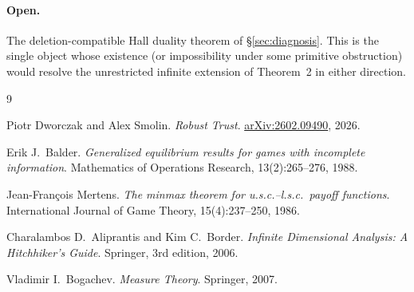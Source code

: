 \documentclass[11pt]{article}
\theoremstyle{definition}
\theoremstyle{remark}
\begin{document}
\paragraph{Open.}
The deletion-compatible Hall duality theorem of \S\ref{sec:diagnosis}.
This is the single object whose existence (or impossibility under
some primitive obstruction) would resolve the unrestricted infinite
extension of Theorem~2 in either direction.

\begin{thebibliography}{9}

Piotr Dworczak and Alex Smolin.
\emph{Robust Trust}.
\href{https://arxiv.org/abs/2602.09490}{arXiv:2602.09490}, 2026.

Erik J.\ Balder.
\emph{Generalized equilibrium results for games with incomplete information}.
Mathematics of Operations Research, 13(2):265--276, 1988.

Jean-François Mertens.
\emph{The minmax theorem for u.s.c.--l.s.c.\ payoff functions}.
International Journal of Game Theory, 15(4):237--250, 1986.

Charalambos D.\ Aliprantis and Kim C.\ Border.
\emph{Infinite Dimensional Analysis: A Hitchhiker's Guide}.
Springer, 3rd edition, 2006.

Vladimir I.\ Bogachev.
\emph{Measure Theory}.
Springer, 2007.

\end{thebibliography}
\end{document}
